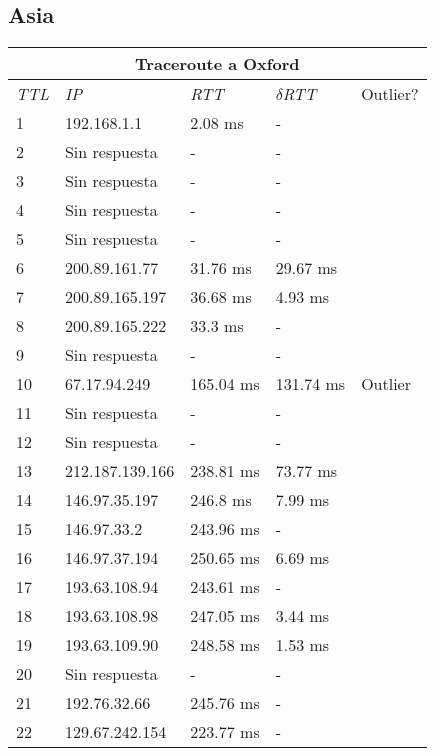 \subsection{Asia}



\begin{tabular}{ |p{1cm}||p{3cm}|p{2cm}|p{2cm}|p{1.5cm}|  }
 \hline
 \multicolumn{5}{|c|}{Traceroute a Oxford} \\
 \hline
 \textit{TTL} & \textit{IP}  & \textit{RTT} & $\delta$\textit{RTT} & Outlier? \\
 \hline
 1   & 192.168.1.1   & 2.08 ms &   - &   \\
 2   & Sin respuesta  & - 	&   - &   \\
 3   & Sin respuesta  & - 	&   - &   \\
 4   & Sin respuesta  & - 	&   - &   \\
 5   & Sin respuesta  & - 	&   - &   \\
 6   & 200.89.161.77  & 31.76 ms &  29.67 ms &   \\
 7   & 200.89.165.197  & 36.68 ms &  4.93 ms &    \\
 8   & 200.89.165.222  & 33.3 ms &  - &   \\
 9   & Sin respuesta  & - &   - &   \\
 10   & 67.17.94.249 & 165.04 ms &  131.74 ms & Outlier \\
 11   & Sin respuesta   & - &   - &   \\
 12   & Sin respuesta   & - &   - &   \\
13   &   212.187.139.166&    238.81 ms  &      73.77 ms  &    \\    
14   &   146.97.35.197  &    246.8 ms   &      7.99 ms  &   \\       
15   &   146.97.33.2   &     243.96 ms  &      -    &   \\         
16   &   146.97.37.194   &   250.65 ms  &      6.69 ms  &    \\       
17   &   193.63.108.94   &   243.61 ms  &      -   &    \\         
18    &  193.63.108.98   &   247.05 ms    &     3.44 ms   &    \\       
19   &   193.63.109.90  &    248.58 ms  &      1.53 ms  &     \\
20   &   Sin respuesta              &    -          &      -    &       \\   
21   &   192.76.32.66   &    245.76 ms  &      -     &       \\    
22   &   129.67.242.154  &   223.77 ms   &     -   &     \\
 \hline
\end{tabular}

\smallskip